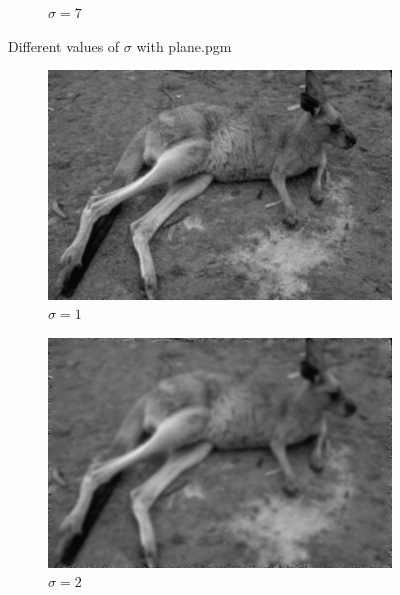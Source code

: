 \documentclass{article}
\begin{document}
\begin{figure}[!h]
\begin{subfigure}{0.3\textwidth}
    \caption{$\sigma = 7$}
    \label{fig:f2}
  \end{subfigure} 
  \caption{Different values of $\sigma$ with plane.pgm}
\end{figure}

\begin{figure}[!h]
  \begin{subfigure}{0.3\textwidth}
    \includegraphics[width=\textwidth]{kangsig1}
    \caption{$\sigma = 1$}
    \label{fig:f1}
  \end{subfigure}
  \hfill
  \begin{subfigure}{0.3\textwidth}
    \includegraphics[width=\textwidth]{kangsig2}
    \caption{$\sigma = 2$}
    \label{fig:f2}
  \end{subfigure}
   \hfill
  \begin{subfigure}{0.3\textwidth}

\end{subfigure}
\end{figure}
\end{document}
